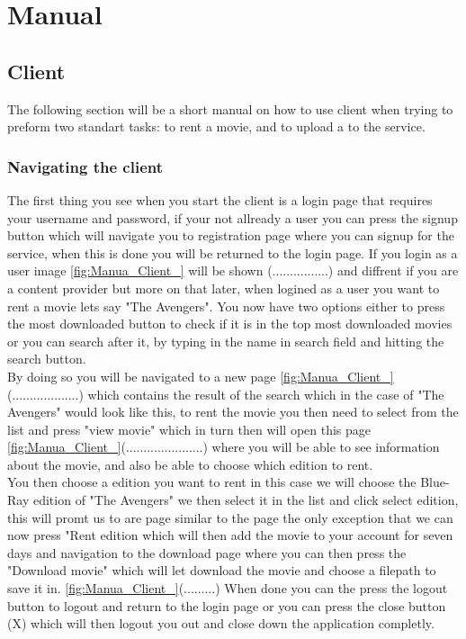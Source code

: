 \chapter{Manual}
\label{Manual}

\section{Client}
\label{Manual_Client}
The following section will be a short manual on how to use client when trying to preform two standart tasks: to rent a movie, and to upload a to the service.
\subsection{Navigating the client}
\label{Manual_Client_Navigation}
The first thing you see when you start the client is a login page that requires your username and password, if your not allready a user you can press the signup button which will navigate you to registration page where you can signup for the service, when this is done you will be returned to the login page. If you login as a user image \ref{fig:Manua_Client_} will be shown (................) and diffrent if you are a content provider but more on that later, when logined as a user you want to rent a movie lets say "The Avengers". You now have two options either to press the most downloaded button to check if it is in the top most downloaded movies or you can search after it, by typing in the name in search field and hitting the search button.
\\ By doing so you will be navigated to a new page \ref{fig:Manua_Client_}(...................) which contains the result of the search which in the case of "The Avengers" would look like this, to rent the movie you then need to select from the list and press "view movie" which in turn then will open this page \ref{fig:Manua_Client_}(......................) where you will be able to see information about the movie, and also be able to choose which edition to rent.
\\ You then choose a edition you want to rent in this case we will choose the Blue-Ray edition of "The Avengers" we then select it in the list and click select edition, this will promt us to are page similar to the page the only exception that we can now press "Rent edition which will then add the movie to your account for seven days and navigation to the download page where you can then press the "Download movie" which will let download the movie and choose a filepath to save it in. \ref{fig:Manua_Client_}(.........) When done you can the press the logout button to logout and return to the login page or you can press the close button (X) which will then logout you out and close down the application completly.

